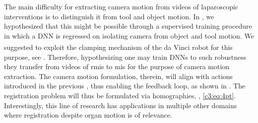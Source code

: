 The main difficulty for extracting camera motion from videos of laparoscopic interventions is to distinguish it from tool and object motion. In , we hypothesized that this might be possible through a supervised training procedure in which a DNN is regressed on isolating camera from object and tool motion. We suggested to exploit the clamping mechanism of the da Vinci\textsuperscript{\textregistered} robot for this purpose, see . Therefore, hypothesizing one may train DNNs to such robustness they transfer from videos of \acrshort{rmis} to \acrshort{mis} for the purpose of camera motion extraction. The camera motion formulation, therein, will align with actions introduced in the previous , thus enabling the feedback loop, as shown in . The registration problem will thus be formulated via homographies, , \eqref{c3:eq:4pt}. Interestingly, this line of research has applications in multiple other domains where registration despite organ motion is of relevance.



